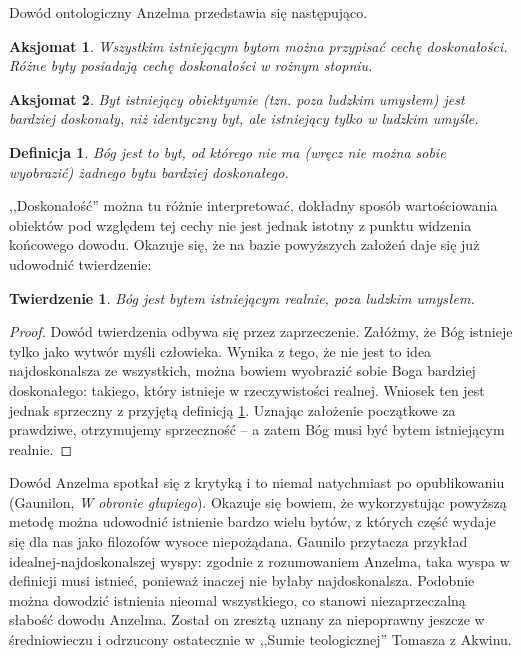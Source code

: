 \documentclass[runningheads]{llncs}
\newtheorem{theorem-pl}{Twierdzenie}
\newtheorem{definition-pl}{Definicja}
\newtheorem{axiom-pl}{Aksjomat}
\begin{document}
Dowód ontologiczny Anzelma przedstawia się następująco. 
\begin{axiom-pl} \label{axiom:1}
	Wszystkim istniejącym bytom można przypisać cechę \emph{doskonałości}. Różne byty posiadają cechę doskonałości w rożnym stopniu. 
\end{axiom-pl}
\begin{axiom-pl} \label{axiom:2}
	Byt istniejący obiektywnie (tzn. poza ludzkim umysłem) jest bardziej doskonały, niż identyczny byt, ale istniejący tylko w ludzkim umyśle. 
\end{axiom-pl}
\begin{definition-pl} \label{def:anzelm-god}
	Bóg jest to byt, od którego nie ma (wręcz nie można sobie wyobrazić) żadnego bytu bardziej doskonałego. 
\end{definition-pl}
\noindent,,Doskonałość'' można tu różnie interpretować, dokładny sposób wartościowania obiektów pod względem tej cechy nie jest jednak istotny z punktu widzenia końcowego dowodu. Okazuje się, że na bazie powyższych założeń daje się już udowodnić twierdzenie:
\begin{theorem-pl} \label{theorem:anzelm-god}
	Bóg jest bytem istniejącym realnie, poza ludzkim umysłem. 
\end{theorem-pl}
\begin{proof}
	Dowód twierdzenia odbywa się przez zaprzeczenie. Załóżmy, że Bóg istnieje tylko jako wytwór myśli człowieka. Wynika z tego, że nie jest to idea najdoskonalsza ze wszystkich, można bowiem wyobrazić sobie Boga bardziej doskonałego: takiego, który istnieje w rzeczywistości realnej. Wniosek ten jest jednak sprzeczny z przyjętą definicją \ref{def:anzelm-god}. Uznając założenie początkowe za prawdziwe, otrzymujemy sprzeczność -- a zatem Bóg musi być bytem istniejącym realnie. 
\end{proof}
Dowód Anzelma spotkał się z krytyką i to niemal natychmiast po opublikowaniu (Gaunilon, \textit{W obronie głupiego}). Okazuje się bowiem, że wykorzystując powyższą metodę można udowodnić istnienie bardzo wielu bytów, z których część wydaje się dla nas jako filozofów wysoce niepożądana. Gaunilo przytacza przykład idealnej-najdoskonalszej wyspy: zgodnie z rozumowaniem Anzelma, taka wyspa w definicji musi istnieć, ponieważ inaczej nie byłaby najdoskonalsza. Podobnie można dowodzić istnienia nieomal wszystkiego, co stanowi niezaprzeczalną słabość dowodu Anzelma. Został on zresztą uznany za niepoprawny jeszcze w średniowieczu i odrzucony ostatecznie w ,,Sumie teologicznej'' Tomasza z Akwinu. 
\end{document}
